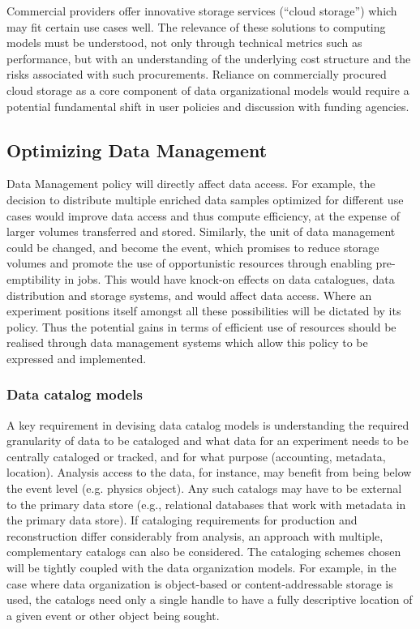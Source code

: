 \documentclass[12pt,a4paper]{article}
\begin{document}
Commercial providers offer innovative storage services (``cloud
storage'') which may fit certain use cases well. The relevance of these
solutions to computing models must be understood, not only through
technical metrics such as performance, but with an understanding of the
underlying cost structure and the risks associated with such
procurements. Reliance on commercially procured cloud storage as a core
component of data organizational models would require a potential
fundamental shift in user policies and discussion with funding agencies.

\subsection{Optimizing Data Management
}\label{optimizing-data-management}

Data Management policy will directly affect data access. For example,
the decision to distribute multiple enriched data samples optimized for
different use cases would improve data access and thus compute
efficiency, at the expense of larger volumes transferred and stored.
Similarly, the unit of data management could be changed, and become the
event, which promises to reduce storage volumes and promote the use of
opportunistic resources through enabling pre-emptibility in jobs. This
would have knock-on effects on data catalogues, data distribution and
storage systems, and would affect data access. Where an experiment
positions itself amongst all these possibilities will be dictated by its
policy. Thus the potential gains in terms of efficient use of resources
should be realised through data management systems which allow this
policy to be expressed and implemented.

\subsubsection{Data catalog models}\label{data-catalog-models}

A key requirement in devising data catalog models is understanding the
required granularity of data to be cataloged and what data for an
experiment needs to be centrally cataloged or tracked, and for what
purpose (accounting, metadata, location). Analysis access to the data,
for instance, may benefit from being below the event level (e.g. physics
object). Any such catalogs may have to be external to the primary data
store (e.g., relational databases that work with metadata in the primary
data store). If cataloging requirements for production and
reconstruction differ considerably from analysis, an approach with
multiple, complementary catalogs can also be considered. The cataloging
schemes chosen will be tightly coupled with the data organization
models. For example, in the case where data organization is object-based
or content-addressable storage is used, the catalogs need only a single
handle to have a fully descriptive location of a given event or other
object being sought.
\end{document}
